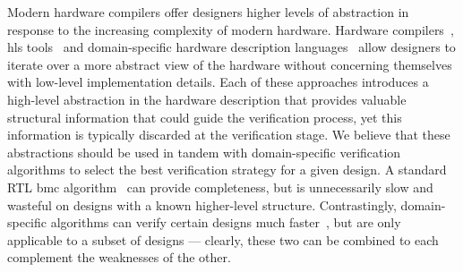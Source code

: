 \documentclass[acmsmall,screen,review]{acmart}
\begin{document}
Modern hardware compilers offer designers higher levels of abstraction in response to the increasing complexity of modern hardware.
Hardware compilers~\cite{calyx, mlir_circt}, \ac{hls} tools~\cite{xilinx_hls, heterohalide, halide_hls, zhang2024optimizing} and domain-specific hardware description languages~\cite{hlhdl, dahlia, chen2024allo} allow designers to iterate over a more abstract view of the hardware without concerning themselves with low-level implementation details.
Each of these approaches introduces a high-level abstraction in the hardware description that provides valuable structural information that could guide the verification process, yet this information is typically discarded at the verification stage.
We believe that these abstractions should be used in tandem with domain-specific verification algorithms to select the best verification strategy for a given design.
A standard RTL \ac{bmc} algorithm~\cite{bmc_found_1} can provide completeness, but is unnecessarily slow and wasteful on designs with a known higher-level structure.
Contrastingly, domain-specific algorithms can verify certain designs much faster~\cite{bogor, cascading_verification}, but are only applicable to a subset of designs --- clearly, these two can be combined to each complement the weaknesses of the other.
\end{document}

